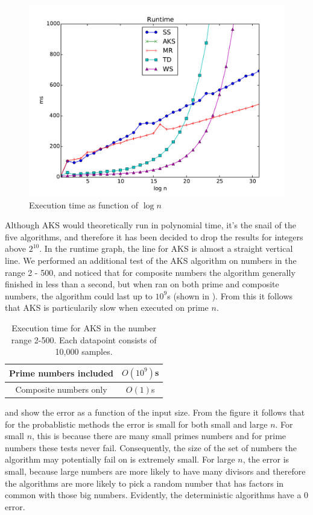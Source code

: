 \begin{figure}
    \centering
    \includegraphics[width=\columnwidth]{results/runtime.pdf}
    \caption{Execution time as function of $\log n$}
    \label{fig:runtime}
\end{figure}

Although AKS would theoretically run in polynomial time,
it's the snail of the five algorithms,
and therefore it has been decided to drop the results for integers above $2^{10}$.
In the runtime graph, the line for AKS is almost a straight vertical line.
We performed an additional test of the AKS algorithm on numbers in the range 2 - 500, and noticed that for composite numbers
the algorithm generally finished in less than a second, but when ran on both prime and composite numbers, the algorithm could last up to $10^9$s (shown in ).
From this it follows that AKS is particularily slow when executed on prime $n$.

\begin{table}
\centering
\caption{Execution time for AKS in the number range 2-500. Each datapoint consists of 10,000 samples.}
\begin{tabular}{|c|c|} \hline
Prime numbers included & $O(10^9)$s\\ \hline
Composite numbers only & $O(1)$s\\ \hline
\end{tabular}
\label{tab:pressure}
\end{table}

 and  show the error as a function of the input size.
From the figure it follows that for the probablistic methods the error is small for both small and large $n$.
For small $n$, this is because there are many small primes numbers and for prime numbers these tests never fail. %
Consequently, the size of the set of numbers the algorithm may potentially fail on is extremely small.
For large $n$, the error is small, because large numbers are more likely to have many divisors and therefore the algorithms are more likely to pick a random number that has factors in common with those big numbers.
Evidently, the deterministic algorithms have a 0 error.

